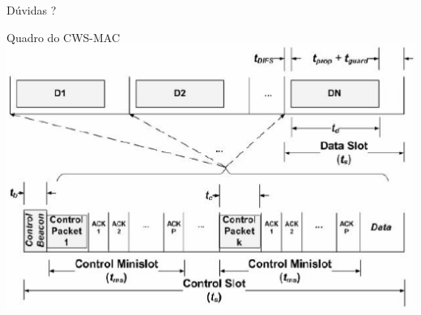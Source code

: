 \documentclass{beamer}
\begin{document}
\begin{frame}
  Dúvidas ?
\end{frame}

\begin{frame}{Quadro do CWS-MAC \cite{20083811560517} \hyperlink{cws-mac_back}{}}
\hypertarget{cws-mac}{}
\includegraphics[scale=0.5]{imagens/cws-mac}
\end{frame}
\end{document}
